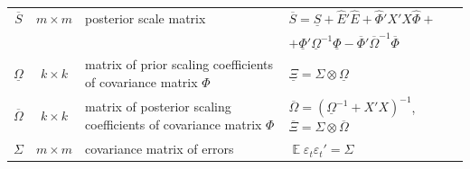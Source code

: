 \documentclass[12pt]{article} %
\DeclareMathOperator{\E}{\mathbb{E}}
\newcommand{\prior}{\underline}
\newcommand{\post}{\overline}
\begin{document}
\begin{center}
\begin{tabular}{ccp{6cm}l}
$\post S $ & $m \times m$ & posterior scale matrix&  $\post S=\prior S +\hat E'\hat E+\hat \Phi'
 X'X \hat \Phi+$\\&&&$ +\prior \Phi'\prior\Omega^{-1}\prior \Phi-\post \Phi'\post\Omega^{-1}\post \Phi$\\
\midrule %
$\prior \Omega$ & $k \times k$ & matrix of prior scaling coefficients of covariance matrix $\Phi$& $\prior \Xi = \Sigma \otimes \prior \Omega$ \\
$\post \Omega$ & $k \times k$ & matrix of posterior scaling coefficients of covariance matrix $\Phi$&  $\post \Omega = (\prior\Omega^{-1}+ X'X)^{-1}$,  $\post \Xi = \Sigma \otimes \post \Omega$\\
$\Sigma$ & $m \times m$ &covariance matrix of errors& $\E\varepsilon_t \varepsilon _t'=\Sigma$\\
\bottomrule
\end{tabular}
\end{center}
\newpage
\end{document}
